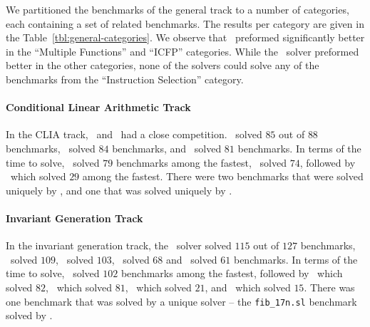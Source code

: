 We partitioned the benchmarks of the general track to a number of categories,
each containing a set of related benchmarks.
The results per category are given in the Table~\ref{tbl:general-categories}.
We observe that \eusolvernew\ preformed significantly better in the ``Multiple Functions'' and ``ICFP'' categories.
While the \cvcnew\ solver preformed better in the other categories,
none of the solvers could solve any of the benchmarks from the ``Instruction Selection'' category.



\paragraph{Conditional Linear Arithmetic Track}
In the CLIA track, \cvcnew\ and \dryd\ had a close competition.
\cvcnew\ solved $85$ out of $88$ benchmarks, \dryd\ solved $84$ benchmarks, and \eusolvernew\ solved $81$ benchmarks.
In terms of the time to solve, \dryd\ solved $79$ benchmarks among the fastest, \cvcnew\ solved $74$,
followed by \eusolvernew\ which solved $29$ among the fastest.
There were two benchmarks that were solved uniquely by \dryd,
and one that was solved uniquely by \cvcnew.

\paragraph{Invariant Generation Track}
In the invariant generation track, the \lig\ solver solved $115$ out of $127$ benchmarks, \cvcnew\ solved $109$,
\dryd\ solved $103$, \horndini\ solved $68$ and \eusolvernew\ solved $61$ benchmarks.
In terms of the time to solve, \lig\ solved $102$ benchmarks among the fastest, followed by \cvcnew\ which solved $82$,
\dryd\ which solved $81$, \horndini\ which solved $21$, and \eusolvernew\ which solved $15$.
There was one benchmark that was solved by a unique solver -- the \texttt{fib_17n.sl} benchmark solved by \lig. 
\vspace{-0.5em}
